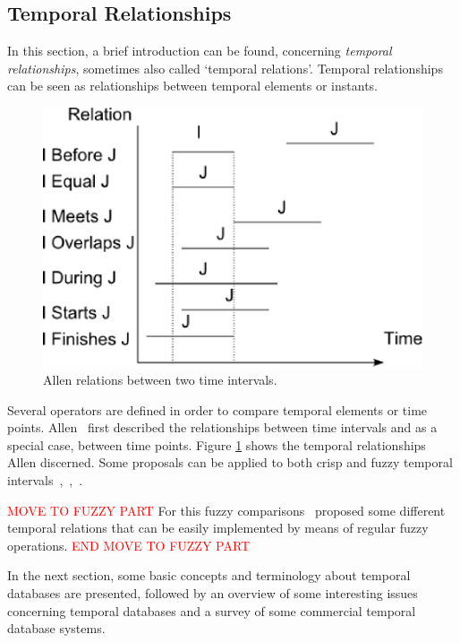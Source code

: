 \subsection{Temporal Relationships}
In this section, a brief introduction can be found, concerning \emph{temporal relationships}, sometimes also called `temporal relations'\cite{Billiet:Pons:Matthe:DeTre:Pons:2011:BipolarFuzzy}. Temporal relationships can be seen as relationships between temporal elements or instants.

\def\JPicScale{0.5}
\begin{figure}[h]
\centering
\includegraphics[scale=0.5]{graphs/allen.eps}
\caption{Allen relations between two time intervals.}
\label{fig:allen}
\end{figure}

Several operators are defined in order to compare temporal elements or time points. Allen~\cite{Allen83} first described the relationships between time intervals and as a special case, between time points. Figure \ref{fig:allen} shows the temporal relationships Allen discerned. Some proposals can be applied to both crisp and fuzzy temporal intervals~\cite{ohlbach2004},~\cite{nagypal2003},~\cite{schockaert08}. 

\textcolor{red}{MOVE TO FUZZY PART}
For this fuzzy comparisons~\cite{garrido2009} proposed some different temporal relations that can be easily implemented by means of regular fuzzy operations.
\textcolor{red}{END MOVE TO FUZZY PART}

In the next section, some basic concepts and terminology about temporal databases are presented, followed by an overview of some interesting issues concerning temporal databases and a survey of some commercial temporal database systems.